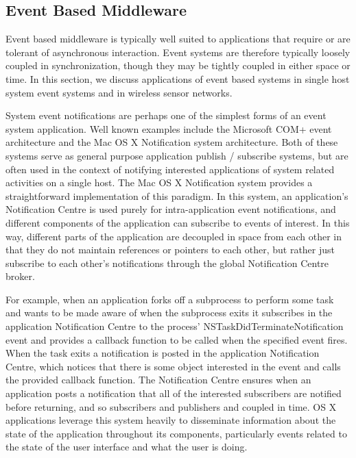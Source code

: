 \documentclass{acm_proc_article-sp}
\begin{document}
\subsection{Event Based Middleware}

Event based middleware is typically well suited to applications that require or are tolerant of asynchronous interaction. Event systems are therefore typically loosely coupled in synchronization, though they may be tightly coupled in either space or time. In this section, we discuss applications of event based systems in single host system event systems and in wireless sensor networks.

System event notifications are perhaps one of the simplest forms of an event system application. Well known examples include the Microsoft COM+ event architecture and the Mac OS X Notification system architecture. Both of these systems serve as general purpose application publish / subscribe systems, but are often used in the context of notifying interested applications of system related activities on a single host. The Mac OS X Notification system \cite{nsnotification} provides a straightforward implementation of this paradigm. In this system, an application's Notification Centre is used purely for intra-application event notifications, and different components of the application can subscribe to events of interest. In this way, different parts of the application are decoupled in space from each other in that they do not maintain references or pointers to each other, but rather just subscribe to each other's notifications through the global Notification Centre broker. 

For example, when an application forks off a subprocess to perform some task and wants to be made aware of when the subprocess exits it subscribes in the application Notification Centre to the process' NSTaskDidTerminateNotification event and provides a callback function to be called when the specified event fires. When the task exits a notification is posted in the application Notification Centre, which notices that there is some object interested in the event and calls the provided callback function. The Notification Centre ensures when an application posts a notification that all of the interested subscribers are notified before returning, and so subscribers and publishers and coupled in time. OS X applications leverage this system heavily to disseminate information about the state of the application throughout its components, particularly events related to the state of the user interface and what the user is doing. 
\end{document}
